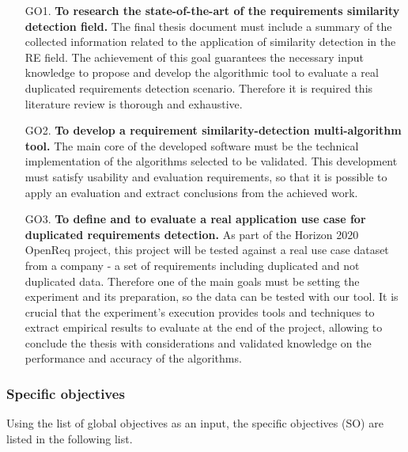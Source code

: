 \documentclass[11pt]{article}
\begin{document}
\begin{enumerate}
\item[GO1.] \textbf{To research the state-of-the-art of the requirements similarity detection field.} The final thesis document must include a summary of the collected information related to the application of similarity detection in the RE field. The achievement of this goal guarantees the necessary input knowledge to propose and develop the algorithmic tool to evaluate a real duplicated requirements detection scenario. Therefore it is required this literature review is thorough and exhaustive.
\item[GO2.] \textbf{To develop a requirement similarity-detection multi-algorithm tool.} The main core of the developed software must be the technical implementation of the algorithms selected to be validated. This development must satisfy usability and evaluation requirements, so that it is possible to apply an evaluation and extract conclusions from the achieved work.
\item[GO3.] \textbf{To define and to evaluate a real application use case for duplicated requirements detection.} As part of the Horizon 2020 OpenReq project, this project will be tested against a real use case dataset from a company - a set of requirements including duplicated and not duplicated data. Therefore one of the main goals must be setting the experiment and its preparation, so the data can be tested with our tool. It is crucial that the experiment's execution provides tools and techniques to extract empirical results to evaluate at the end of the project, allowing to conclude the thesis with considerations and validated knowledge on the performance and accuracy of the algorithms.
\end{enumerate}

\subsubsection{Specific objectives}
\label{sec:spec_objectives}

Using the list of global objectives as an input, the specific objectives (SO) are listed in the following list.
\end{document}
